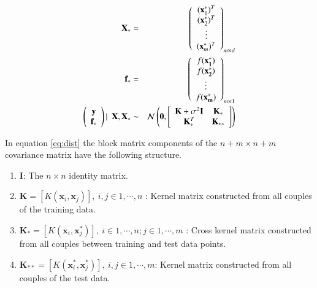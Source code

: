 \documentclass[referee,a4paper,12pt,traditabstract]{swsc}
\begin{document}
\begin{linenumbers}
\begin{eqnarray}
    \mathbf{X}_* & = & \left( \begin{array}{c} (\mathbf{x}^{*}_1)^T \\ (\mathbf{x}^{*}_2)^T \\ \vdots \\ (\mathbf{x}^{*}_m)^T \end{array} \right)_{m \times d} \\
    \mathbf{f}_* & = & \left( \begin{array}{c} f(\mathbf{x^{*}_1}) \\ f(\mathbf{x^{*}_2}) \\ \vdots \\ f(\mathbf{x^{*}_m}) \end{array} \right)_{m \times 1} \\
     \vspace{4\baselineskip}
    \left( \begin{array}{c} \mathbf{y} \\ \mathbf{f_*} \end{array} \right) | \ \ \mathbf{X}, \mathbf{X}_* & \sim & 
    \mathcal{N}\left(\mathbf{0}, \left[ \begin{array}{cc} \mathbf{K} + \sigma^{2} \mathbf{I} & \mathbf{K}_{*} \\ \mathbf{K}_{*}^T & \mathbf{K}_{**} \end{array} \right ] \right) \label{eq:dist}
\end{eqnarray}

In equation \ref{eq:dist} the block matrix components of the $n+m \times n+m$ covariance matrix have the following structure.

\begin{enumerate}
      \item $\mathbf{I}$: The $n \times n$ identity matrix.
      \item $\mathbf{K} = [K(\mathbf{x}_i, \mathbf{x}_j)], \ i,j \in 1,\cdots,n$ : Kernel matrix constructed from all couples of the training data.
      \item $\mathbf{K}_{*} = [K(\mathbf{x}_i, \mathbf{x}^{*}_j)], \ i \in 1,\cdots,n ; j \in 1,\cdots,m$ : Cross kernel matrix constructed from all couples between training and test data points.
      \item $\mathbf{K}_{**} = [K(\mathbf{x}^{*}_i, \mathbf{x}^{*}_j)], \ i,j \in 1,\cdots,m$: Kernel matrix constructed from all couples of the test data.
\end{enumerate}


\end{linenumbers}
\end{document}
